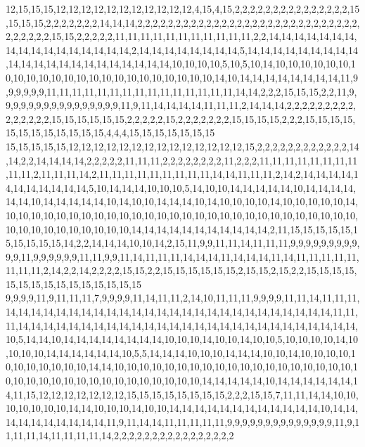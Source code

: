 12,15,15,15,12,12,12,12,12,12,12,12,12,12,12,4,15,4,15,2,2,2,2,2,2,2,2,2,2,2,2,2,2,2,15,15,15,15,2,2,2,2,2,2,2,14,14,14,2,2,2,2,2,2,2,2,2,2,2,2,2,2,2,2,2,2,2,2,2,2,2,2,2,2,2,2,2,2,2,2,2,2,2,15,15,2,2,2,2,2,11,11,11,11,11,11,11,11,11,11,11,2,2,14,14,14,14,14,14,14,14,14,14,14,14,14,14,14,14,14,2,14,14,14,14,14,14,14,14,5,14,14,14,14,14,14,14,14,14,14,14,14,14,14,14,14,14,14,14,14,14,14,10,10,10,10,5,10,5,10,14,10,10,10,10,10,10,10,10,10,10,10,10,10,10,10,10,10,10,10,10,10,10,10,14,10,14,14,14,14,14,14,14,14,11,9,9,9,9,9,9,11,11,11,11,11,11,11,11,11,11,11,11,11,11,11,14,14,2,2,2,15,15,15,2,2,11,9,9,9,9,9,9,9,9,9,9,9,9,9,9,9,9,11,9,11,14,14,14,14,11,11,11,2,14,14,14,2,2,2,2,2,2,2,2,2,2,2,2,2,2,2,15,15,15,15,15,15,2,2,2,2,2,15,2,2,2,2,2,2,2,15,15,15,15,2,2,2,15,15,15,15,15,15,15,15,15,15,15,15,4,4,4,15,15,15,15,15,15,15
15,15,15,15,15,12,12,12,12,12,12,12,12,12,12,12,12,12,12,15,2,2,2,2,2,2,2,2,2,2,2,2,14,14,2,2,14,14,14,14,2,2,2,2,2,11,11,11,2,2,2,2,2,2,2,2,11,2,2,2,11,11,11,11,11,11,11,11,11,11,2,11,11,11,14,2,11,11,11,11,11,11,11,11,11,14,14,11,11,11,2,14,2,14,14,14,14,14,14,14,14,14,14,14,5,10,14,14,14,10,10,10,5,14,10,10,14,14,14,14,14,10,14,14,14,14,14,14,10,14,14,14,14,14,10,14,10,10,14,14,14,10,14,10,10,10,10,14,10,10,10,10,10,14,10,10,10,10,10,10,10,10,10,10,10,10,10,10,10,10,10,10,10,10,10,10,10,10,10,10,10,10,10,10,10,10,10,10,10,10,10,10,14,14,14,14,14,14,14,14,14,14,14,2,11,15,15,15,15,15,15,15,15,15,15,14,2,2,14,14,14,10,10,14,2,15,11,9,9,11,11,14,11,11,11,9,9,9,9,9,9,9,9,9,9,9,11,9,9,9,9,9,9,11,11,9,9,11,14,11,11,11,14,14,14,11,14,14,14,11,14,11,11,11,11,11,11,11,11,2,14,2,2,14,2,2,2,2,15,15,2,2,15,15,15,15,15,15,2,15,15,2,15,2,2,15,15,15,15,15,15,15,15,15,15,15,15,15,15,15
9,9,9,9,11,9,11,11,11,7,9,9,9,9,11,14,11,11,2,14,10,11,11,11,9,9,9,9,11,11,14,11,11,11,14,14,14,14,14,14,14,14,14,14,14,14,14,14,14,14,14,14,14,14,14,14,14,14,14,14,11,11,11,14,14,14,14,14,14,14,14,14,14,14,14,14,14,14,14,14,14,14,14,14,14,14,14,14,14,14,10,5,14,14,10,14,14,14,14,14,14,14,14,10,10,10,14,10,10,14,10,10,5,10,10,10,10,14,10,10,10,10,14,14,14,14,14,14,10,5,5,14,14,14,10,10,10,14,14,14,10,10,14,10,10,10,10,10,10,10,10,10,10,10,14,14,10,10,10,10,10,10,10,10,10,10,10,10,10,10,10,10,10,10,10,10,10,10,10,10,10,10,10,10,10,10,10,10,10,10,10,14,14,14,14,14,10,14,14,14,14,14,14,14,11,15,12,12,12,12,12,12,12,15,15,15,15,15,15,15,15,2,2,2,15,15,7,11,11,14,14,10,10,10,10,10,10,10,14,14,10,10,10,14,10,10,14,14,14,14,14,14,14,14,14,14,14,14,10,14,14,14,14,14,14,14,14,14,14,11,9,11,14,14,11,11,11,11,11,9,9,9,9,9,9,9,9,9,9,9,9,9,9,11,9,11,11,11,14,11,11,11,11,14,2,2,2,2,2,2,2,2,2,2,2,2,2,2,2,2
